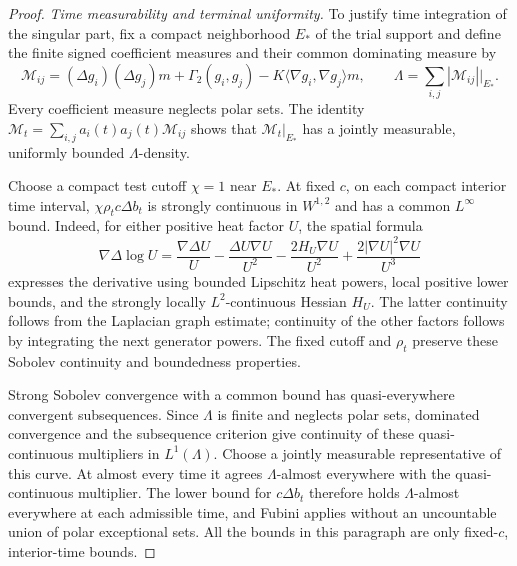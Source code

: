 \begin{proof}
\emph{Time measurability and terminal uniformity.}
To justify time integration of the singular part, fix a compact
neighborhood \(E_*\) of the trial support and define the finite
signed coefficient measures and their common dominating measure by
\[
\mathcal M_{ij}=(\Delta g_i)(\Delta g_j)m
+\Gamma_2(g_i,g_j)-K\langle\nabla g_i,\nabla g_j\rangle m,
\qquad
\Lambda=\sum_{i,j}|\mathcal M_{ij}|\big|_{E_*}.
\]
Every coefficient measure neglects polar sets. The identity
\(\mathcal M_t=\sum_{i,j}a_i(t)a_j(t)\mathcal M_{ij}\)
shows that \(\mathcal M_t|_{E_*}\) has a jointly measurable,
uniformly bounded \(\Lambda\)-density.

Choose a compact test cutoff \(\chi=1\) near \(E_*\).
At fixed \(c\), on each compact interior time interval,
\(\chi\rho_t c\Delta b_t\) is strongly continuous in
\(W^{1,2}\) and has a common \(L^\infty\) bound. Indeed,
for either positive heat factor \(U\), the spatial formula
\[
\nabla\Delta\log U
=\frac{\nabla\Delta U}{U}
-\frac{\Delta U\nabla U}{U^2}
-\frac{2H_U\nabla U}{U^2}
+\frac{2|\nabla U|^2\nabla U}{U^3}
\]
expresses the derivative using bounded Lipschitz heat powers,
local positive lower bounds, and the strongly locally
\(L^2\)-continuous Hessian \(H_U\). The latter continuity
follows from the Laplacian graph estimate; continuity of the
other factors follows by integrating the next generator
powers. The fixed cutoff and \(\rho_t\) preserve these
Sobolev continuity and boundedness properties.

Strong Sobolev convergence with a common bound has
quasi-everywhere convergent subsequences. Since \(\Lambda\)
is finite and neglects polar sets, dominated convergence and
the subsequence criterion give continuity of these
quasi-continuous multipliers in \(L^1(\Lambda)\). Choose a
jointly measurable representative of this curve. At almost
every time it agrees \(\Lambda\)-almost everywhere with the
quasi-continuous multiplier. The lower bound for
\(c\Delta b_t\) therefore holds \(\Lambda\)-almost everywhere
at each admissible time, and Fubini applies without an
uncountable union of polar exceptional sets. All the bounds
in this paragraph are only fixed-\(c\), interior-time bounds.


\end{proof}
